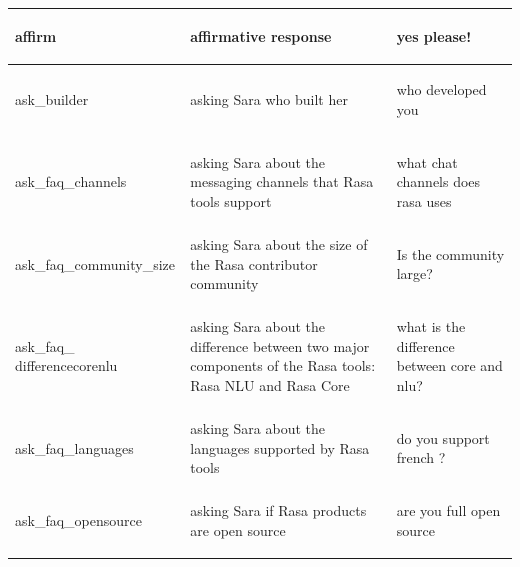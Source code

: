 \documentclass[bsc,frontabs,singlespacing,parskip,deptreport]{infthesis}
\begin{document}
{\begin{center}
\begin{longtable}{p{}|p{}|p{}}
    \begin{spverbatim}affirm\end{spverbatim} & affirmative response & \begin{spverbatim}yes please!\end{spverbatim} \\
    \hline
    \begin{spverbatim}ask_builder\end{spverbatim} & asking Sara who built her & \begin{spverbatim}who developed you\end{spverbatim} \\
    \hline
    \begin{spverbatim}ask_faq_channels\end{spverbatim} & asking Sara about the messaging channels that Rasa tools support & \begin{spverbatim}what chat channels does rasa uses\end{spverbatim} \\
    \hline
    \begin{spverbatim}ask_faq_community_size\end{spverbatim} & asking Sara about the size of the Rasa contributor community & \begin{spverbatim}Is the community large?\end{spverbatim} \\
    \hline
    \begin{spverbatim}ask_faq_
    differencecorenlu\end{spverbatim} & asking Sara about the difference between two major components of the Rasa tools: Rasa NLU and Rasa Core & \begin{spverbatim}what is the difference between core and nlu?\end{spverbatim} \\
    \hline
    \begin{spverbatim}ask_faq_languages\end{spverbatim} & asking Sara about the languages supported by Rasa tools & \begin{spverbatim}do you support french ?\end{spverbatim} \\
    \hline
    \begin{spverbatim}ask_faq_opensource\end{spverbatim} & asking Sara if Rasa products are open source & \begin{spverbatim}are you full open source\end{spverbatim} \\

\end{longtable}
\end{center}}
\end{document}
